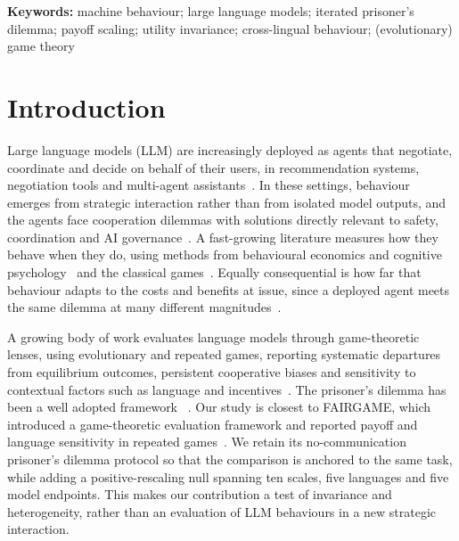 \documentclass[11pt,a4paper]{article}
\begin{document}
\noindent\textbf{Keywords:} machine behaviour; large language models; iterated prisoner's dilemma; payoff scaling; utility invariance; cross-lingual behaviour; (evolutionary) game theory


\section{Introduction}\label{sec:intro}

Large language models (LLM) are increasingly deployed as agents that
negotiate, coordinate and decide on behalf of their users, in recommendation
systems, negotiation tools and multi-agent
assistants~\cite{park2023generative,tessler2024ai,hammond2025multi,cook2024llm}.
In these settings, behaviour emerges from strategic interaction rather than from
isolated model outputs, and the agents face cooperation dilemmas with
solutions  directly relevant to  safety, coordination and AI
governance~\cite{dafoe2021cooperative,lu2024llms,han2026social,idowu2026mapping}.
A fast-growing literature measures how they behave when they do, using methods from behavioural economics and cognitive
psychology~\cite{binz2023using,horton2023large,aher2023using,rilla2026recognising} and  the
classical games~\cite{mei2024turing}. Equally consequential is how far that
behaviour adapts to the costs and benefits at issue, since a deployed agent
meets the same dilemma at many different magnitudes~\cite{hammond2025multi}.

A growing body of work evaluates language models through game-theoretic
lenses, using evolutionary and repeated games, reporting
systematic departures from equilibrium outcomes, persistent cooperative biases and
sensitivity to contextual factors such as language and
incentives~\cite{buscemi2025fairgame,sun2025gtllm_survey,mao2025alympics,pal2026strategiescooperationdefectionlarge,willis2025will,fan2024can,pires2025large,fu2026optimal,xie2026evolutionary}.
The prisoner's dilemma has been a well adopted framework ~\cite{axelrod1981evolution,axelrod1984evolution,nowak1992tit,nowak1993strategy,nowak2006five,pressDyson2012}.
Our study is closest to FAIRGAME, which introduced a game-theoretic
evaluation framework and reported payoff and language sensitivity in repeated
games~\cite{buscemi2025fairgame}. We retain its no-communication prisoner's
dilemma protocol so that the comparison is anchored to the same task, while
adding a positive-rescaling null spanning ten scales, five languages and five
model endpoints. This makes our
contribution a test of invariance and heterogeneity, rather than an evaluation of LLM behaviours in a new strategic interaction.
\end{document}
